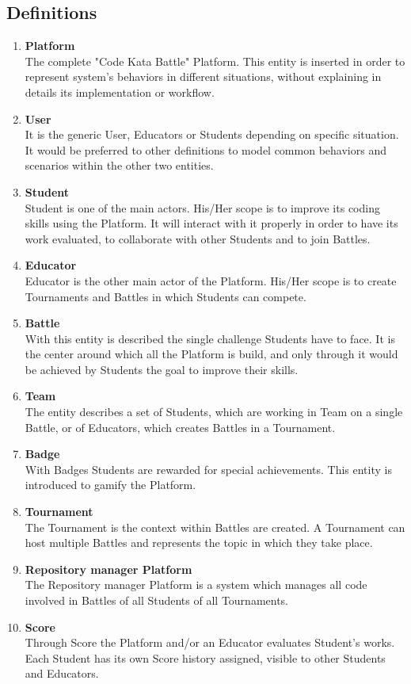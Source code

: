 \subsection{Definitions}
\begin{enumerate}[label=$\bullet$]
    \item \textbf{Platform}\\The complete "Code Kata Battle" Platform. This entity is inserted in order to represent system's behaviors in different situations, without explaining in details its implementation or workflow.
    \item \textbf{User}\\It is the generic User, Educators or Students depending on specific situation. It would be preferred to other definitions to model common behaviors and scenarios within the other two entities.
    \item \textbf{Student}\\Student is one of the main actors. His/Her scope is to improve its coding skills using the Platform. It will interact with it properly in order to have its work evaluated, to collaborate with other Students and to join Battles.
    \item \textbf{Educator}\\Educator is the other main actor of the Platform. His/Her scope is to create Tournaments and Battles in which Students can compete.
    \item \textbf{Battle}\\With this entity is described the single challenge Students have to face. It is the center around which all the Platform is build, and only through it would be achieved by Students the goal to improve their skills.
    \item \textbf{Team}\\The entity describes a set of Students, which are working in Team on a single Battle, or of Educators, which creates Battles in a Tournament.
    \item \textbf{Badge}\\With Badges Students are rewarded for special achievements. This entity is introduced to gamify the Platform.
    \item \textbf{Tournament}\\The Tournament is the context within Battles are created. A Tournament can host multiple Battles and represents the topic in which they take place.
    \item \textbf{Repository manager Platform}\\The Repository manager Platform is a system which manages all code involved in Battles of all Students of all Tournaments.
    \item \textbf{Score}\\Through Score the Platform and/or an Educator evaluates Student's works. Each Student has its own Score history assigned, visible to other Students and Educators.
\end{enumerate}
